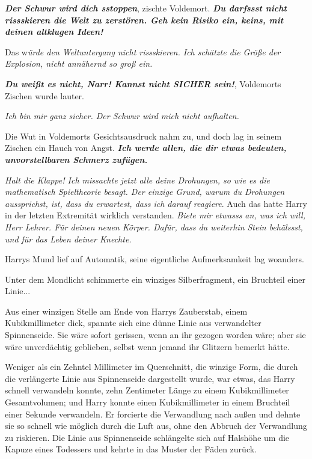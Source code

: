 \glqq{}\textbf{\emph{Der Schwur wird dich sstoppen}}\grqq{}, zischte Voldemort.
\glqq{}\textbf{\emph{Du darfssst nicht rissskieren die Welt zu zerstören. Geh
kein Risiko ein, keins, mit deinen altklugen Ideen!}}\grqq{}

\glqq{}Das w\emph{ürde den Weltuntergang nicht rissskieren. Ich schätzte die
Größe der Explosion, nicht annähernd so groß ein.}\grqq{}

\glqq{}\textbf{\emph{Du weißt es nicht, Narr! Kannst nicht SICHER sein!}}\grqq{},
Voldemorts Zischen wurde lauter.

\glqq{}\emph{Ich bin mir ganz sicher. Der Schwur wird mich nicht
aufhalten.}\grqq{}

Die Wut in Voldemorts Gesichtsausdruck nahm zu, und doch lag in seinem Zischen
ein Hauch von Angst. \glqq{}\textbf{\emph{Ich werde allen, die dir etwas
bedeuten, unvorstellbaren Schmerz zufügen.}}\grqq{}

\glqq{}\emph{Halt die Klappe! Ich missachte jetzt alle deine Drohungen, so wie es
die mathematisch Spieltheorie besagt. Der einzige Grund, warum du Drohungen
aussprichst, ist, dass du erwartest, dass ich darauf reagiere}.\grqq{} Auch das
hatte Harry in der letzten Extremität wirklich verstanden. \glqq{}\emph{Biete mir
etwasss an, was ich will, Herr Lehrer. Für deinen neuen Körper. Dafür, dass du
weiterhin Stein behälssst, und für das Leben deiner Knechte.}\grqq{}

Harrys Mund lief auf Automatik, seine eigentliche Aufmerksamkeit lag woanders.

Unter dem Mondlicht schimmerte ein winziges Silberfragment, ein Bruchteil einer
Linie...

Aus einer winzigen Stelle am Ende von Harrys Zauberstab, einem Kubikmillimeter
dick, spannte sich eine dünne Linie aus verwandelter Spinnenseide. Sie wäre
sofort gerissen, wenn an ihr gezogen worden wäre; aber sie wäre unverdächtig
geblieben, selbst wenn jemand ihr Glitzern bemerkt hätte.

Weniger als ein Zehntel Millimeter im Querschnitt, die winzige Form, die durch
die verlängerte Linie aus Spinnenseide dargestellt wurde, war etwas, das Harry
schnell verwandeln konnte, zehn Zentimeter Länge zu einem Kubikmillimeter
Gesamtvolumen; und Harry konnte einen Kubikmillimeter in einem Bruchteil einer
Sekunde verwandeln. Er forcierte die Verwandlung nach außen und dehnte sie so
schnell wie möglich durch die Luft aus, ohne den Abbruch der Verwandlung zu
riskieren. Die Linie aus Spinnenseide schlängelte sich auf Halshöhe um die
Kapuze eines Todessers und kehrte in das Muster der Fäden zurück.


